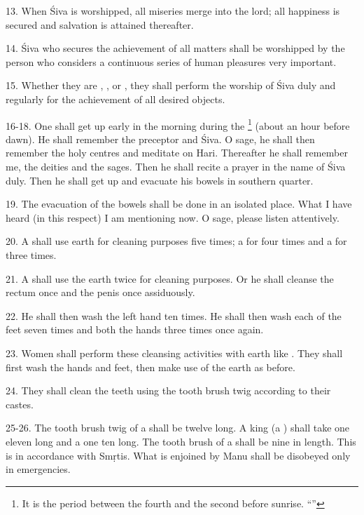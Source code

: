 13. When Śiva is worshipped, all miseries merge into the lord; all happiness is
secured and salvation is attained thereafter.

14. Śiva who secures the achievement of all matters shall be worshipped by
the person who considers a continuous series of human pleasures very important.

15. Whether they are , ,  or ,
they shall perform the worship of Śiva duly and regularly for the achievement of
all desired objects.

16-18. One shall get up early in the morning during the 
\footnote{It is the period between the fourth and the second 
before sunrise. “”}
(about an hour before dawn). He shall remember the preceptor and Śiva. O sage,
he shall then remember the holy centres and meditate on Hari. Thereafter he
shall remember me, the deities and the sages. Then he shall recite a prayer in
the name of Śiva duly. Then he shall get up and evacuate his bowels in southern
quarter.

19. The evacuation of the bowels shall be done in an isolated place. What I have
heard (in this respect) I am mentioning now. O sage, please listen attentively.

20. A  shall use earth for cleaning purposes five times;
a  for four times and a  for three times.

21. A  shall use the earth twice for cleaning purposes. Or he shall
cleanse the rectum once and the penis once assiduously.

22. He shall then wash the left hand ten times. He shall then wash each of
the feet seven times and both the hands three times once again.

23. Women shall perform these cleansing activities with earth like .
They shall first wash the hands and feet, then make use of the earth as before.

24. They shall clean the teeth using the tooth brush twig according to their
castes.

25-26. The tooth brush twig of a  shall be twelve  long.
A king (a ) shall take one eleven  long and
a  one ten  long. The tooth brush of a  shall
be nine  in length. This is in accordance with Smṛtis. What is
enjoined by Manu shall be disobeyed only in emergencies.

